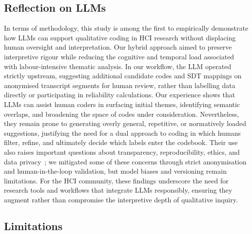 \subsection{Reflection\textit{} on LLMs}
In terms of methodology, this study is among the first to empirically demonstrate how LLMs can support qualitative coding in HCI research without displacing human oversight and interpretation. Our hybrid approach aimed to preserve interpretive rigour while reducing the cognitive and temporal load associated with labour-intensive thematic analysis. In our workflow, the LLM operated strictly upstream, suggesting additional candidate codes and SDT mappings on anonymised transcript segments for human review, rather than labelling data directly or participating in reliability calculations. Our experience shows that LLMs can assist human coders in surfacing initial themes, identifying semantic overlaps, and broadening the space of codes under consideration. Nevertheless, they remain prone to generating overly general, repetitive, or normatively loaded suggestions, justifying the need for a dual approach to coding in which humans filter, refine, and ultimately decide which labels enter the codebook. Their use also raises important questions about transparency, reproducibility, ethics, and data privacy~\cite{Schroeder2025LLMs}; we mitigated some of these concerns through strict anonymisation and human-in-the-loop validation, but model biases and versioning remain limitations. For the HCI community, these findings underscore the need for research tools and workflows that integrate LLMs responsibly, ensuring they augment rather than compromise the interpretive depth of qualitative inquiry.

\subsection{Limitations}

